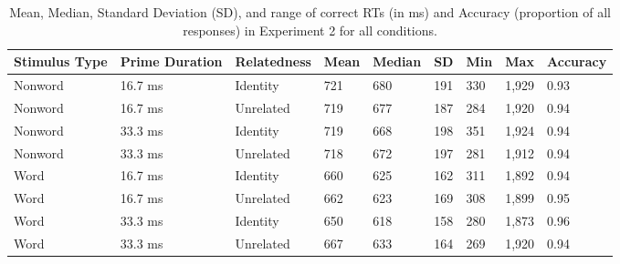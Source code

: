 \documentclass[
  english,
  man,floatsintext]{apa6}
\begin{document}
\begin{table}[tbp]

\begin{center}
\begin{threeparttable}

\caption{\label{tab:exp2-descriptive-rt-table}Mean, Median, Standard Deviation (SD), and range of correct RTs (in ms) and Accuracy (proportion of all responses) in Experiment 2 for all conditions.}

\begin{tabular}{lllllllll}
\toprule
Stimulus Type & \multicolumn{1}{c}{Prime Duration} & \multicolumn{1}{c}{Relatedness} & \multicolumn{1}{c}{Mean} & \multicolumn{1}{c}{Median} & \multicolumn{1}{c}{SD} & \multicolumn{1}{c}{Min} & \multicolumn{1}{c}{Max} & \multicolumn{1}{c}{Accuracy}\\
\midrule
Nonword & 16.7 ms & Identity & 721 & 680 & 191 & 330 & 1,929 & 0.93\\
Nonword & 16.7 ms & Unrelated & 719 & 677 & 187 & 284 & 1,920 & 0.94\\
Nonword & 33.3 ms & Identity & 719 & 668 & 198 & 351 & 1,924 & 0.94\\
Nonword & 33.3 ms & Unrelated & 718 & 672 & 197 & 281 & 1,912 & 0.94\\
Word & 16.7 ms & Identity & 660 & 625 & 162 & 311 & 1,892 & 0.94\\
Word & 16.7 ms & Unrelated & 662 & 623 & 169 & 308 & 1,899 & 0.95\\
Word & 33.3 ms & Identity & 650 & 618 & 158 & 280 & 1,873 & 0.96\\
Word & 33.3 ms & Unrelated & 667 & 633 & 164 & 269 & 1,920 & 0.94\\
\bottomrule
\end{tabular}

\end{threeparttable}
\end{center}

\end{table}
\end{document}
